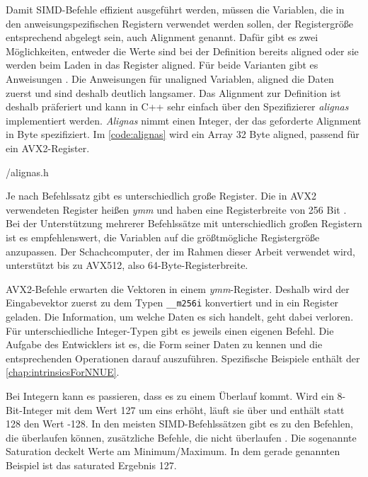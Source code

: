 Damit \ac{SIMD}-Befehle effizient ausgeführt werden, müssen die Variablen, die in den anweisungspezifischen Registern verwendet werden sollen, der Registergröße entsprechend abgelegt sein, auch Alignment genannt. Dafür gibt es zwei Möglichkeiten, entweder die Werte sind bei der Definition bereits aligned oder sie werden beim Laden in das Register aligned. Für beide Varianten gibt es Anweisungen \cite{intelIntrinsics}. Die Anweisungen für unaligned Variablen, aligned die Daten zuerst und sind deshalb deutlich langsamer. Das Alignment zur Definition ist deshalb präferiert und kann in C++ sehr einfach über den Spezifizierer \emph{alignas} implementiert werden. \emph{Alignas} nimmt einen Integer, der das geforderte Alignment in Byte spezifiziert. Im \autoref{code:alignas} wird ein Array 32 Byte aligned, passend für ein \ac{AVX2}-Register.


{\srcloc/alignas.h}

Je nach Befehlssatz gibt es unterschiedlich große Register. Die in \ac{AVX2} verwendeten Register heißen \emph{ymm} und haben eine Registerbreite von 256 Bit \cite{intelIntrinsics}. Bei der Unterstützung mehrerer Befehlssätze mit unterschiedlich großen Registern ist es empfehlenswert, die Variablen auf die größtmögliche Registergröße anzupassen. Der Schachcomputer, der im Rahmen dieser Arbeit verwendet wird, unterstützt bis zu \ac{AVX512}, also 64-Byte-Registerbreite.

\ac{AVX2}-Befehle erwarten die Vektoren in einem \emph{ymm}-Register. Deshalb wird der Eingabevektor zuerst zu dem Typen \lstinline[language=C++]{__m256i} konvertiert und in ein Register geladen. Die Information, um welche Daten es sich handelt, geht dabei verloren. Für unterschiedliche Integer-Typen gibt es jeweils einen eigenen Befehl. Die Aufgabe des Entwicklers ist es, die Form seiner Daten zu kennen und die entsprechenden Operationen darauf auszuführen. Spezifische Beispiele enthält der \autoref{chap:intrinsicsForNNUE}.

Bei Integern kann es passieren, dass es zu einem Überlauf kommt. Wird ein 8-Bit-Integer mit dem Wert 127 um eins erhöht, läuft sie über und enthält statt 128 den Wert -128. In den meisten \ac{SIMD}-Befehlssätzen gibt es zu den Befehlen, die überlaufen können, zusätzliche Befehle, die nicht überlaufen \cite{intelIntrinsics}. Die sogenannte Saturation deckelt Werte am Minimum/Maximum. In dem gerade genannten Beispiel ist das saturated Ergebnis 127.

